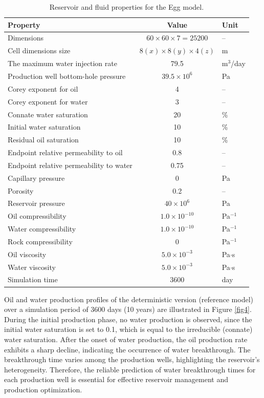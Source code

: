 \documentclass[pdflatex,sn-basic]{sn-jnl}%
\theoremstyle{thmstyleone}%
\theoremstyle{thmstyletwo}%
\theoremstyle{thmstylethree}%
\begin{document}
\begin{table}[h]
\centering
\caption{Reservoir and fluid properties for the Egg model.}
\label{tab3}
\begin{tabular}{lcl}
\hline
\textbf{Property} & \textbf{Value} & \textbf{Unit} \\
\hline
Dimensions & $60 \times 60 \times 7 = 25200$ & -- \\
Cell dimensions size & $8(x) \times 8(y) \times 4(z)$ & m \\
The maximum water injection rate & 79.5 & m$^3$/day \\
Production well bottom-hole pressure & $39.5 \times 10^6$ & Pa \\
Corey exponent for oil & 4 & -- \\
Corey exponent for water & 3 & -- \\
Connate water saturation & 20 & \% \\
Initial water saturation & 10 & \% \\
Residual oil saturation & 10 & \% \\
Endpoint relative permeability to oil & 0.8 & -- \\
Endpoint relative permeability to water & 0.75 & -- \\
Capillary pressure & 0 & Pa \\
Porosity & 0.2 & -- \\
Reservoir pressure & $40 \times 10^6$ & Pa \\
Oil compressibility & $1.0 \times 10^{-10}$ & Pa$^{-1}$ \\
Water compressibility & $1.0 \times 10^{-10}$ & Pa$^{-1}$ \\
Rock compressibility & 0 & Pa$^{-1}$ \\
Oil viscosity & $5.0 \times 10^{-3}$ & Pa$\cdot$s \\
Water viscosity & $5.0 \times 10^{-3}$ & Pa$\cdot$s \\
Simulation time & 3600 & day \\
\hline
\end{tabular}
\end{table}

Oil and water production profiles of the deterministic version (reference model) over a simulation period of 3600 days (10 years) are illustrated in Figure \ref{fig4}. During the initial production phase, no water production is observed, since the initial water saturation is set to 0.1, which is equal to the irreducible (connate) water saturation. After the onset of water production, the oil production rate exhibits a sharp decline, indicating the occurrence of water breakthrough. The breakthrough time varies among the production wells, highlighting the reservoir's heterogeneity. Therefore, the reliable prediction of water breakthrough times for each production well is essential for effective reservoir management and production optimization.
\end{document}
